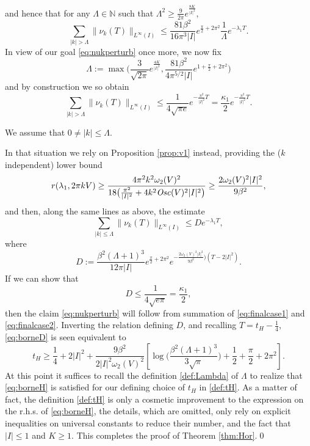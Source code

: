 \documentclass[12pt]{article}
\newcommand{\N}{\mathbb{N}}
\begin{document}
and hence that for any $\Lambda \in \N$ such that $\Lambda^2 \geq
\frac{9}{2\pi}e^{\frac{8K}{|I|^2}},$
\begin{equation*}
\sum_{|k| > \Lambda}\|\nu_k(T)\|_{L^\infty(I)} \leq \frac{81\beta^2}{16\pi^3|I|}
e^{\frac{\pi}{2} + 2\pi^2} \frac{1}{\Lambda} e^{-\lambda_1 T}.
\end{equation*}
In view of our goal \eqref{eq:nukperturb} once more, we now fix  
\begin{equation}\label{def:Lambda}
\Lambda := \max\Big(\frac{3}{\sqrt{2\pi}}e^{\frac{4K}{|I|^2}},
\frac{81\beta^2}{4\pi^{5/2}|I|}e^{1 + \frac{\pi}{2} + 2\pi^2} \Big)
\end{equation}
and by construction we so obtain  
\begin{equation}\label{eq:finalcase1}
\sum_{|k| > \Lambda}\|\nu_k(T)\|_{L^\infty(I)} 
\leq \frac{1}{4\sqrt{\pi e}} e^{-\frac{\pi^2}{|I|^2} T} 
= \frac{\kappa_1}{2} e^{-\frac{\pi^2}{|I|^2} T}.
\end{equation}

 We assume that $0 \neq |k| \leq \Lambda.$

In that situation we rely on Proposition \ref{prop:v1} instead, providing the
($k$ independent) lower bound 
$$
r(\lambda_1, 2\pi kV) 
\geq \frac{4\pi^2k^2
\omega_2(V)^2}{18\big(\frac{\pi^2}{|I|^2} + 4 k^2{\it Osc}(V)^2|I|^2\big)}
\geq \frac{2\omega_2(V)^2|I|^2}{9\beta^2},
$$
and then, along the same lines as above, the estimate
\begin{equation}\label{eq:finalcase2}
\sum_{|k| \leq \Lambda}\|\nu_k(T)\|_{L^\infty(I)} \leq D  e^{-\lambda_1 T},
\end{equation}
where
$$
D := \frac{\beta^2(\Lambda + 1)^3}{12\pi|I|} e^{\frac{\pi}{2} + 2\pi^2}
e^{-\frac{2\omega_2(V)^2|I|^2}{9\beta^2})(T-2|I|^2)}.
$$
If we can show that 
\begin{equation}\label{eq:borneD}
D \leq \frac{1}{4\sqrt{e\pi}} = \frac{\kappa_1}{2},
\end{equation}
then the claim \eqref{eq:nukperturb} will follow from summation of
\eqref{eq:finalcase1} and \eqref{eq:finalcase2}. Inverting the relation defining
$D$, and recalling $T = t_H - \frac{1}{4}$, \eqref{eq:borneD} is seen equivalent to 
\begin{equation}\label{eq:borneH}
t_H \geq \frac14 + 2|I|^2 + \frac{9\beta^2}{2|I|^2\omega_2(V)^2} \left[ \log\Big(
\frac{\beta^2(\Lambda + 1)^3}{3 \sqrt{\pi}}\Big) + \frac12 + \frac{\pi}{2} +
2\pi^2\right].
\end{equation}
At this point it suffices to recall the definition \eqref{def:Lambda} 
of $\Lambda$ to realize that \eqref{eq:borneH} is satisfied for our 
defining choice of $t_H$ in \eqref{def:tH}. As a matter of fact, the definition
\eqref{def:tH} is only a cosmetic improvement to the expression on the r.h.s.  
of \eqref{eq:borneH}, the details, which are omitted, only rely on explicit 
inequalities on universal constants to reduce their number, and the fact that 
$|I| \leq 1$ and $K \geq 1.$ This completes the proof of Theorem \ref{thm:Hor}.\qed
\end{document}

